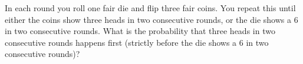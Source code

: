 In each round you roll one fair die and flip three fair coins. You repeat this until either the coins show three heads in two consecutive rounds, or the die shows a $6$ in two consecutive rounds. What is the probability that three heads in two consecutive rounds happens first (strictly before the die shows a $6$ in two consecutive rounds)?
